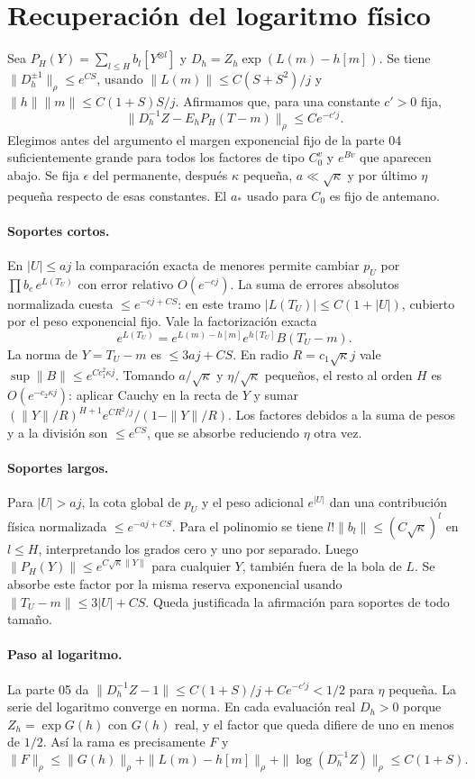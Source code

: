 \section{Recuperación del logaritmo físico}
Sea $P_H(Y)=\sum_{l\le H}b_l[Y^{\otimes l}]$ y $D_h=Z_h\exp(L(m)-h[m])$.
Se tiene $\|D_h^{\pm1}\|_\rho\le e^{CS}$, usando $\|L(m)\|\le C(S+S^2)/j$
y $\|h\|\|m\|\le C(1+S)S/j$. Afirmamos que, para una constante $c'>0$ fija,
\[
 \|D_h^{-1} Z-E_h P_H(T-m)\|_\rho\le C e^{-c' j}.
\]
Elegimos antes del argumento el margen exponencial fijo de la parte 04 suficientemente
grande para todos los factores de tipo $C_0^v$ y $e^{Bv}$ que aparecen abajo.
Se fija $\epsilon$ del permanente, después $\kappa$ pequeña, $a\ll\sqrt\kappa$ y por último
$\eta$ pequeña respecto de esas constantes. El $a_*$ usado para $C_0$ es fijo de antemano.
\paragraph{Soportes cortos.}
En $|U|\le aj$ la comparación exacta de menores permite cambiar $p_U$ por
$\prod b_e\,e^{L(T_U)}$ con error relativo $O(e^{-cj})$. La suma de errores absolutos
normalizada cuesta $\le e^{-cj+CS}$: en este tramo $|L(T_U)|\le C(1+|U|)$, cubierto
por el peso exponencial fijo. Vale la factorización exacta
\[
 e^{L(T_U)}=e^{L(m)-h[m]}e^{h[T_U]}B(T_U-m).
\]
La norma de $Y=T_U-m$ es $\le3aj+CS$. En radio $R=c_1\sqrt\kappa j$ vale
$\sup\|B\|\le e^{C c_1^2\kappa j}$. Tomando $a/\sqrt\kappa$ y $\eta/\sqrt\kappa$
pequeños, el resto al orden $H$ es $O(e^{-c_2\kappa j})$: aplicar Cauchy
en la recta de $Y$ y sumar $(\|Y\|/R)^{H+1}e^{C R^2/j}/(1-\|Y\|/R)$.
Los factores debidos a la suma de pesos y a la división son $\le e^{CS}$,
que se absorbe reduciendo $\eta$ otra vez.
\paragraph{Soportes largos.}
Para $|U|>aj$, la cota global de $p_U$ y el peso adicional $e^{|U|}$ dan
una contribución física normalizada $\le e^{-aj+CS}$. Para el polinomio se tiene
$l!\|b_l\|\le(C\sqrt{\kappa})^l$ en $l\le H$, interpretando los grados cero y uno
por separado. Luego $\|P_H(Y)\|\le e^{C\sqrt\kappa\|Y\|}$ para cualquier $Y$,
también fuera de la bola de $L$. Se absorbe este factor por la misma reserva exponencial
usando $\|T_U-m\|\le3|U|+CS$. Queda justificada la afirmación para soportes de todo tamaño.
\paragraph{Paso al logaritmo.}
La parte 05 da $\|D_h^{-1}Z-1\|\le C(1+S)/j+Ce^{-c'j}<1/2$ para $\eta$ pequeña.
La serie del logaritmo converge en norma. En cada evaluación real $D_h>0$ porque
$Z_h=\exp G(h)$ con $G(h)$ real, y el factor que queda difiere de uno en menos de $1/2$.
Así la rama es precisamente $F$ y
\[
 \|F\|_\rho\le \|G(h)\|_\rho+\|L(m)-h[m]\|_\rho+
           \|\log(D_h^{-1}Z)\|_\rho\le C(1+S).
\]
